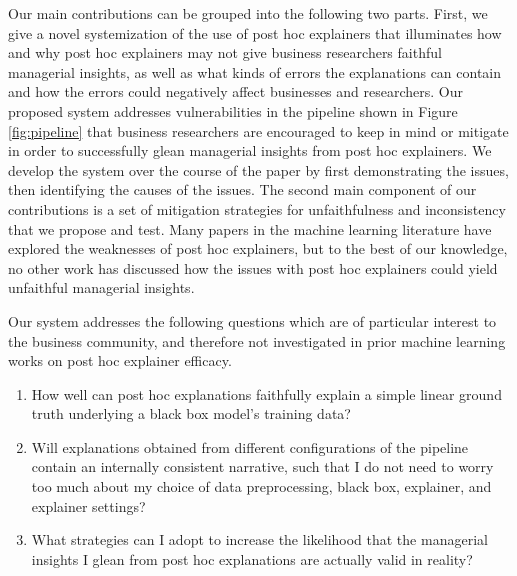 \documentclass[mnsc,blindrev]{informs3}
\begin{document}
   Our main contributions can be grouped into the following two parts. First, we give a novel systemization of the use of post hoc explainers that illuminates how and why post hoc explainers may not give business researchers faithful managerial insights, as well as what kinds of errors the explanations can contain and how the errors could negatively affect businesses and researchers. Our proposed system addresses vulnerabilities in the pipeline shown in Figure \ref{fig:pipeline} that business researchers are encouraged to keep in mind or mitigate in order to successfully glean managerial insights from post hoc explainers. We develop the system over the course of the paper by first demonstrating the issues, then identifying the causes of the issues. The second main component of our contributions is a set of mitigation strategies for unfaithfulness and inconsistency that we propose and test. Many papers in the machine learning literature have explored the weaknesses of post hoc explainers, but to the best of our knowledge, no other work has discussed how the issues with post hoc explainers could yield unfaithful managerial insights.   %

Our system addresses the following questions which are of particular interest to the business community, and therefore not investigated in prior machine learning works on post hoc explainer efficacy. 
\begin{enumerate}
    \item How well can post hoc explanations faithfully explain a simple linear ground truth underlying a black box model's training data?
    \item Will explanations obtained from different configurations of the pipeline contain an internally consistent narrative, such that I do not need to worry too much about my choice of data preprocessing, black box, explainer, and explainer settings? 
    \item What strategies can I adopt to increase the likelihood that the managerial insights I glean from post hoc explanations are actually valid in reality?
\end{enumerate}
\end{document}

